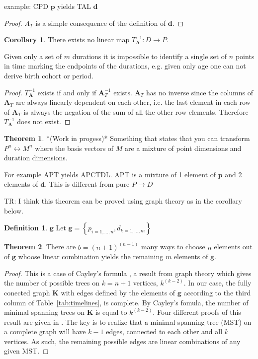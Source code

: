 \documentclass[12pt,oneside,a4paper]{article} %
\theoremstyle{definition}
\newtheorem{definition}{Definition}[section]
\newtheorem{theorem}{Theorem}[section]
\newtheorem{corollary}{Corollary}[theorem]
\newcommand\vt[1]{\textcolor{rd}{#1}}
\begin{document}
\begin{appendices}
\vt{example: CPD $\textbf{p}$ yields TAL $\textbf{d}$}

\begin{proof} $A_T$ is a simple consequence of the definition of
$\textbf{d}$.
\end{proof}

\begin{corollary} There exists no linear map $T_\textbf{A}^{-1}: D \rightarrow
P$.
\end{corollary}

Given only a set of $m$ durations it is impossible to identify a single set of
$n$ points in time marking the endpoints of the durations, e.g. given only age one can not derive birth cohort or period.

\begin{proof} $T_\textbf{A}^{-1}$ exists if and only if $\textbf{A}_T^{-1}$ exists. $\textbf{A}_T$ has no inverse since the columns of $\textbf{A}_T$ are always linearly dependent on each other, i.e. the last element in each row of $\textbf{A}_T$ is always the negation of the sum of all the other row elements. Therefore $T_\textbf{A}^{-1}$ does not exist.
\end{proof}

\begin{theorem}
\label{mixing} *(Work in progess)* Something that states that you can transform
 $P^n \leftrightarrow M^n$ where the basis vectors of $M$ are a mixture of point dimensions and duration dimensions.
\end{theorem}
\vt{For example APT yields APCTDL. APT is a mixture of 1 element of
$\textbf{p}$ and 2 elements of $\textbf{d}$. This is different from pure
$P\rightarrow D$}

\vt{TR: I think this theorem can be proved using graph theory as in the
corollary below.}


\begin{definition}{$\textbf{g}$}
Let $\textbf{g} = \left\{p_{i=1,\ldots,n},
d_{k=1,\ldots,m}\right\}$
\end{definition}

\begin{theorem} There are $b = (n+1)^{(n-1)}$ many
ways to choose $n$ elements out of $\textbf{g}$ whoose linear combination yields the
remaining $m$ elements of $\textbf{g}$.
\end{theorem}

\begin{proof}
This is a case of Cayley's formula \citep{cayley1889}, a result from
graph theory which gives the number of possible trees on $k = n+1$ vertices,
$k^{(k-2)}$. In our case, the fully conected graph $\textbf{K}$ with edges
defined by the elements of $\textbf{g}$ according to the third column of
Table~\ref{tab:timelines}, is complete. By Cayley's fomula, the number of
minimal spanning trees on $\textbf{K}$ is equal to $k^{(k-2)}$. Four different proofs of
this result are given in \citet{aigner2010proofs}. The key is to realize that a
minimal spanning tree (MST) on a complete graph will have $k-1$ edges, connected
to each other and all $k$ vertices. As such, the remaining possible edges are
linear combinations of any given MST.
\end{proof}


\end{appendices}
\end{document}
